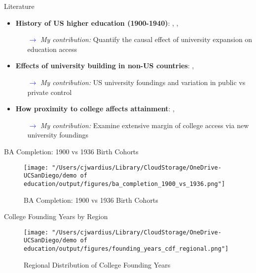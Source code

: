 \documentclass[notes,11pt, aspectratio=169]{beamer}
\begin{document}
\begin{frame}{Literature}
  \begin{itemize}
    \item \textbf{History of US higher education (1900-1940)}: \cite{goldinAmericasGraduationHigh1998}, \cite{goldinOriginsStateLevelDifferences1998}, \cite{goldinHumanCapitalCenturyAmerican2001}
    \begin{itemize}
      \item[\textcolor{blue}{$\rightarrow$}] \textit{My contribution:} Quantify the causal effect of university expansion on education access
    \end{itemize}

    \item \textbf{Effects of university building in non-US countries}: \cite{dufloSchoolingLaborMarket2001}, \cite{nimier-davidLocalHumanCapital2023}
    \begin{itemize}
      \item[\textcolor{blue}{$\rightarrow$}] \textit{My contribution:} US university foundings and variation in public vs private control
    \end{itemize}

    \item \textbf{How proximity to college affects attainment}: \cite{cardUsingGeographicVariation1993}, \cite{actonDistanceDegreesHow2025}
    \begin{itemize}
      \item[\textcolor{blue}{$\rightarrow$}] \textit{My contribution:} Examine extensive margin of college access via new university foundings
    \end{itemize}
  \end{itemize}
\end{frame}



\begin{frame}{BA Completion: 1900 vs 1936 Birth Cohorts}
    \begin{figure}
        \centering
        \texttt{[image: "/Users/cjwardius/Library/CloudStorage/OneDrive-UCSanDiego/demo of education/output/figures/ba\_completion\_1900\_vs\_1936.png"]}
        \caption{BA Completion: 1900 vs 1936 Birth Cohorts}
    \end{figure}
\end{frame}

\begin{frame}{College Founding Years by Region}
    \begin{figure}
        \centering
        \texttt{[image: "/Users/cjwardius/Library/CloudStorage/OneDrive-UCSanDiego/demo of education/output/figures/founding\_years\_cdf\_regional.png"]}
        \caption{Regional Distribution of College Founding Years}
    \end{figure}
\end{frame}
\end{document}
